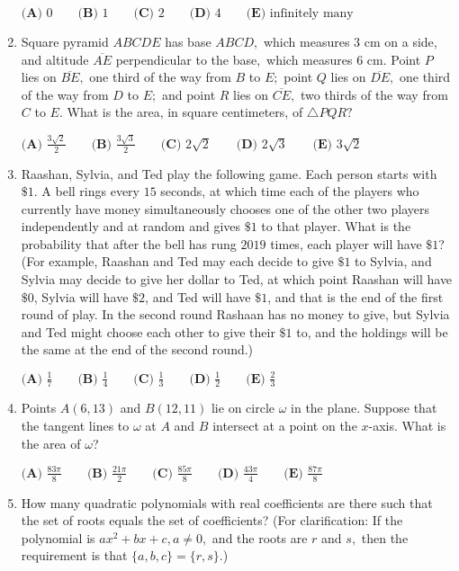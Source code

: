 \documentclass{article}
\begin{document}
\begin{enumerate}[label=\arabic*., itemsep=0.5em]
\(\textbf{(A) }0\qquad\textbf{(B) }1\qquad\textbf{(C) }2\qquad\textbf{(D) }4\qquad\textbf{(E) }\text{infinitely many}\)\par \vspace{0.5em}\item Square pyramid \(ABCDE\) has base \(ABCD,\) which measures \(3\) cm on a side, and altitude \(\overline{AE}\) perpendicular to the base\(,\) which measures \(6\) cm. Point \(P\) lies on \(\overline{BE},\) one third of the way from \(B\) to \(E;\) point \(Q\) lies on \(\overline{DE},\) one third of the way from \(D\) to \(E;\) and point \(R\) lies on \(\overline{CE},\) two thirds of the way from \(C\) to \(E.\) What is the area, in square centimeters, of \(\triangle PQR?\)

\(\textbf{(A) } \frac{3\sqrt2}{2} \qquad\textbf{(B) } \frac{3\sqrt3}{2} \qquad\textbf{(C) } 2\sqrt2 \qquad\textbf{(D) } 2\sqrt3 \qquad\textbf{(E) } 3\sqrt2\)\par \vspace{0.5em}\item Raashan, Sylvia, and Ted play the following game. Each person starts with \(\$1\). A bell rings every \(15\) seconds, at which time each of the players who currently have money simultaneously chooses one of the other two players independently and at random and gives \(\$1\) to that player. What is the probability that after the bell has rung \(2019\) times, each player will have \(\$1\)? 
(For example, Raashan and Ted may each decide to give \(\$1\) to Sylvia, and Sylvia may decide to give her dollar to Ted, at which point Raashan will have \(\$0\), Sylvia will have \(\$2\), and Ted will have \(\$1\), and that is the end of the first round of play. In the second round Rashaan has no money to give, but Sylvia and Ted might choose each other to give their \( \$1\) to, and the holdings will be the same at the end of the second round.)

\(\textbf{(A) } \frac{1}{7} \qquad\textbf{(B) } \frac{1}{4} \qquad\textbf{(C) } \frac{1}{3} \qquad\textbf{(D) } \frac{1}{2} \qquad\textbf{(E) } \frac{2}{3}\)\par \vspace{0.5em}\item Points \(A(6,13)\) and \(B(12,11)\) lie on circle \(\omega\) in the plane. Suppose that the tangent lines to \(\omega\) at \(A\) and \(B\) intersect at a point on the \(x\)-axis. What is the area of \(\omega\)?

\(\textbf{(A) }\frac{83\pi}{8}\qquad\textbf{(B) }\frac{21\pi}{2}\qquad\textbf{(C) }
\frac{85\pi}{8}\qquad\textbf{(D) }\frac{43\pi}{4}\qquad\textbf{(E) }\frac{87\pi}{8}\)\par \vspace{0.5em}\item How many quadratic polynomials with real coefficients are there such that the set of roots equals the set of coefficients? (For clarification: If the polynomial is \(ax^2+bx+c,a\neq 0,\) and the roots are \(r\) and \(s,\) then the requirement is that \(\{a,b,c\}=\{r,s\}\).)


\end{enumerate}
\end{document}
